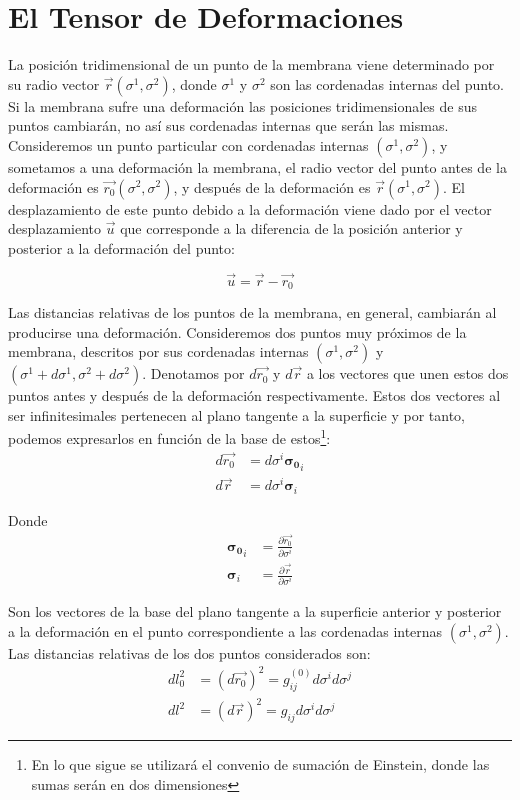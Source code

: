 \section{El Tensor de Deformaciones}
La posición tridimensional de un punto de la membrana viene determinado por su radio vector
$\vec{r}(\sigma^1,\sigma^2)$, donde $\sigma^1$ y $\sigma^2$ son las cordenadas
internas del punto. Si la membrana sufre una deformación las posiciones
tridimensionales de sus puntos cambiarán, no así sus cordenadas
internas que serán las mismas. Consideremos un punto particular con cordenadas internas
$(\sigma^1,\sigma^2)$, y sometamos a una deformación la membrana, el radio
vector del punto antes de la deformación es $\vec{r_0}(\sigma^2,\sigma^2)$, y
después de la deformación es $\vec{r}(\sigma^1,\sigma^2)$. El desplazamiento
de este punto debido a la deformación viene dado por el vector desplazamiento
$\vec{u}$ que corresponde a la diferencia de la posición anterior y posterior
a la deformación del punto: 

\begin{equation}\label{vector_u}
\vec{u}=\vec{r}-\vec{r_0}
\end{equation}

Las distancias relativas de los puntos de la membrana, en general, cambiarán
al producirse una deformación. Consideremos dos puntos muy próximos de la
membrana, descritos por sus cordenadas internas $(\sigma^1,\sigma^2)$ y
$(\sigma^1+d\sigma^1,\sigma^2+d\sigma^2)$. Denotamos por $d\vec{r_0}$ y
$d\vec{r}$ a los vectores que unen estos dos puntos antes y después de la
deformación respectivamente. Estos dos vectores al ser infinitesimales
pertenecen al plano tangente a la superficie y por tanto, podemos expresarlos
en función de la base de estos\footnote{En lo que sigue se utilizará el
  convenio de sumación de Einstein, donde las sumas serán en dos dimensiones}:
\begin{align}
d\vec{r_0}&=d\sigma^i \boldsymbol{\sigma_0}_i\label{dr0_vectorial}\\
d\vec{r}&=d\sigma^i \boldsymbol{\sigma}_i
\end{align}

Donde
\begin{align*}
\boldsymbol{\sigma_0}_i&=\frac{\partial \vec{r_0}}{\partial \sigma^i}\\
\boldsymbol{\sigma}_i&=\frac{\partial \vec{r}}{\partial \sigma^i}
\end{align*}

Son los vectores de la base del plano tangente a la superficie anterior y
posterior a la deformación en el punto correspondiente a las cordenadas
internas $(\sigma^1,\sigma^2)$. Las distancias relativas de los dos puntos
considerados son: 
\begin{align}
dl^2_0&=(d\vec{r_0})^2=g^{(0)}_{ij}d\sigma^id\sigma^j\label{dl0}\\
dl^2&=(d\vec{r})^2=g_{ij}d\sigma^id\sigma^j
\end{align}

